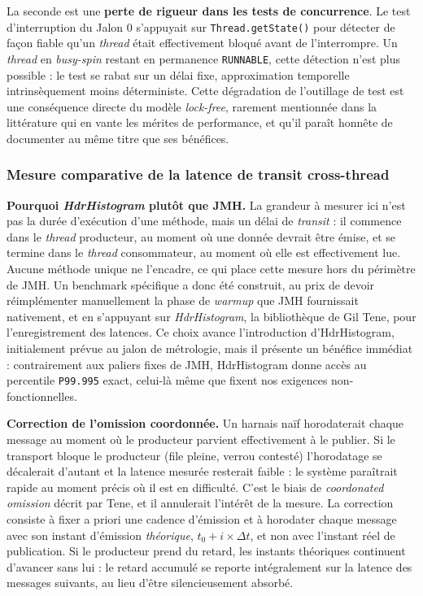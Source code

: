 La seconde est une \textbf{perte de rigueur dans les tests de concurrence}. Le test d'interruption du Jalon 0 s'appuyait sur \texttt{Thread.getState()} pour détecter de façon fiable qu'un \textit{thread} était effectivement bloqué avant de l'interrompre. Un \textit{thread} en \textit{busy-spin} restant en permanence \texttt{RUNNABLE}, cette détection n'est plus possible : le test se rabat sur un délai fixe, approximation temporelle intrinsèquement moins déterministe. Cette dégradation de l'outillage de test est une conséquence directe du modèle \textit{lock-free}, rarement mentionnée dans la littérature qui en vante les mérites de performance, et qu'il paraît honnête de documenter au même titre que ses bénéfices.

\subsubsection{Mesure comparative de la latence de transit cross-thread}

\textbf{Pourquoi \textit{HdrHistogram} plutôt que JMH.} La grandeur à mesurer ici n'est pas la durée d'exécution d'une méthode, mais un délai de \textit{transit} : il commence dans le \textit{thread} producteur, au moment où une donnée devrait être émise, et se termine dans le \textit{thread} consommateur, au moment où elle est effectivement lue. Aucune méthode unique ne l'encadre, ce qui place cette mesure hors du périmètre de JMH. Un benchmark spécifique a donc été construit, au prix de devoir réimplémenter manuellement la phase de \textit{warmup} que JMH fournissait nativement, et en s'appuyant sur \textit{HdrHistogram}, la bibliothèque de Gil Tene, pour l'enregistrement des latences. Ce choix avance l'introduction d'HdrHistogram, initialement prévue au jalon de métrologie, mais il présente un bénéfice immédiat : contrairement aux paliers fixes de JMH, HdrHistogram donne accès au percentile \texttt{P99.995} exact, celui-là même que fixent nos exigences non-fonctionnelles.

\textbf{Correction de l'omission coordonnée.} Un harnais naïf horodaterait chaque message au moment où le producteur parvient effectivement à le publier. Si le transport bloque le producteur (file pleine, verrou contesté) l'horodatage se décalerait d'autant et la latence mesurée resterait faible : le système paraîtrait rapide au moment précis où il est en difficulté. C'est le biais de \textit{coordonated omission} décrit par Tene, et il annulerait l'intérêt de la mesure. La correction consiste à fixer a priori une cadence d'émission et à horodater chaque message avec son instant d'émission \textit{théorique}, $t_0 + i \times \Delta t$, et non avec l'instant réel de publication. Si le producteur prend du retard, les instants théoriques continuent d'avancer sans lui : le retard accumulé se reporte intégralement sur la latence des messages suivants, au lieu d'être silencieusement absorbé.

